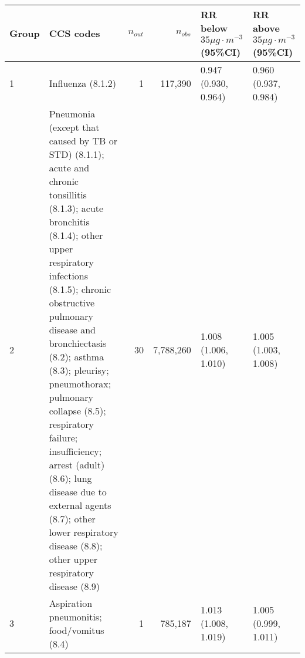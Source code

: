 \begin{tabular}{lp{6.5cm}rrp{2.2cm}p{2.2cm}}
  \hline
Group & CCS codes & $n_{out}$ & $n_{obs}$ & RR below $35 \mu g \cdot m^{-3}$ (95\%CI) & RR above $35 \mu g \cdot m^{-3}$ (95\%CI) \\ 
  \hline
   1 & Influenza (8.1.2) &    1 & 117,390 & 0.947 (0.930, 0.964) & 0.960 (0.937, 0.984) \\ 
     2 & Pneumonia (except that caused by TB or STD) (8.1.1); acute and chronic tonsillitis (8.1.3); acute bronchitis (8.1.4); other upper respiratory infections (8.1.5); chronic obstructive pulmonary disease and bronchiectasis (8.2); asthma (8.3); pleurisy; pneumothorax; pulmonary collapse (8.5); respiratory failure; insufficiency; arrest (adult) (8.6); lung disease due to external agents (8.7); other lower respiratory disease (8.8); other upper respiratory disease (8.9) &   30 & 7,788,260 & 1.008 (1.006, 1.010) & 1.005 (1.003, 1.008) \\ 
     3 & Aspiration pneumonitis; food/vomitus (8.4) &    1 & 785,187 & 1.013 (1.008, 1.019) & 1.005 (0.999, 1.011) \\ 
   \hline
\end{tabular}

